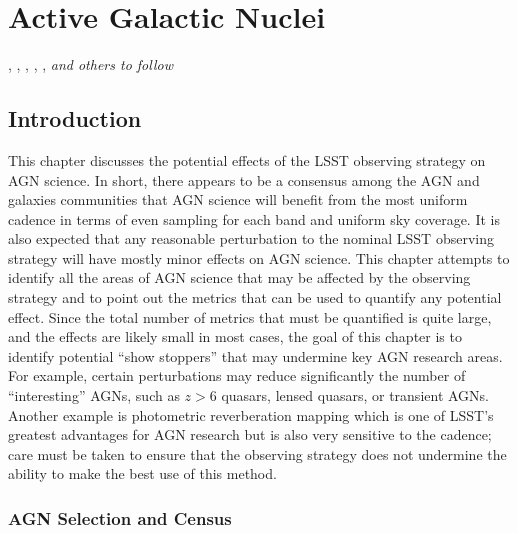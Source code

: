 
\chapter[AGN]{Active Galactic Nuclei}
\def\chpname{agn}\label{chp:\chpname}

,
,
,
,
,
{\it and others to follow}


\section{Introduction}
\label{sec:\chpname:intro}


This chapter discusses the potential effects of the LSST observing
strategy on AGN science. In short, there appears to be a consensus
among the AGN and galaxies communities that AGN science will benefit
from the most uniform cadence in terms of even sampling for each band
and uniform sky coverage. It is also expected that any reasonable
perturbation to the nominal LSST observing strategy will have mostly
minor effects on AGN science. This chapter attempts to identify all
the areas of AGN science that may be affected by the observing strategy
and to point out the metrics that can be used to quantify any potential
effect. Since the total number of metrics that must be quantified is
quite large, and the effects are likely small in most cases, the goal
of this chapter is to identify potential ``show stoppers'' that may undermine
key AGN research areas. For example, certain perturbations may reduce
significantly the number of ``interesting'' AGNs, such as $z>6$ quasars,
lensed quasars, or transient AGNs. Another example is photometric
reverberation mapping which is one of LSST's greatest advantages for
AGN research but is also very sensitive to the cadence; care must be
taken to ensure that the observing strategy does not undermine the
ability to make the best use of this method.



\subsection{AGN Selection and Census}
\label{sec:\secname:selection}

